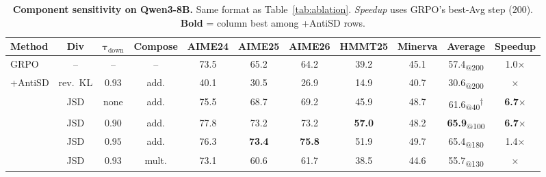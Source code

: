 \begin{table}[t]
  \caption{\textbf{Component sensitivity on Qwen3-8B.} Same format as Table~\ref{tab:ablation}. \emph{Speedup} uses GRPO's best-Avg step ($200$). \textbf{Bold} = column best among +AntiSD rows.}
  \label{tab:ablation-qn}
  \centering
  \small
  \setlength{\tabcolsep}{1.5pt}
  \renewcommand{\arraystretch}{1.0}
  \begin{tabular}{l|ccc|cccccc|c}
    \toprule
    \textbf{Method}          & \textbf{Div} & $\boldsymbol{\tau_{\mathrm{down}}}$ & \textbf{Compose}             & \textbf{AIME24} & \textbf{AIME25} & \textbf{AIME26} & \textbf{HMMT25} & \textbf{Minerva} & \textbf{Average}                                   & \textbf{Speedup}     \\
    \midrule
    GRPO                     & --           & --                                  & --                           & 73.5            & 65.2            & 64.2            & 39.2            & 45.1             & 57.4\textsubscript{@200}                           & 1.0$\times$          \\
    \midrule
    \multirow{7}{*}{+AntiSD} & rev.~KL      & $0.93$                              & add.                         & 40.1            & 30.5            & 26.9            & 14.9            & 40.7             & 30.6\textsubscript{@200}                           & $\times$             \\
    \cmidrule{2-11}
                             & JSD          & none                                & add.                         & 75.5            & 68.7            & 69.2            & 45.9            & 48.7             & 61.6\textsubscript{@40}\textsuperscript{$\dagger$} & \textbf{6.7$\times$} \\
                             & JSD          & $0.90$                              & add.                         & 77.8            & 73.2            & 73.2            & \textbf{57.0}   & 48.2             & \textbf{65.9}\textsubscript{@100}                  & \textbf{6.7$\times$} \\
                             & JSD          & $0.95$                              & add.                         & 76.3            & \textbf{73.4}   & \textbf{75.8}   & 51.9            & 49.7             & 65.4\textsubscript{@180}                           & 1.4$\times$          \\
    \cmidrule{2-11}
                             & JSD          & $0.93$                              & mult.                        & 73.1            & 60.6            & 61.7            & 38.5            & 44.6             & 55.7\textsubscript{@130}                           & $\times$             \\

\end{tabular}
\end{table}
